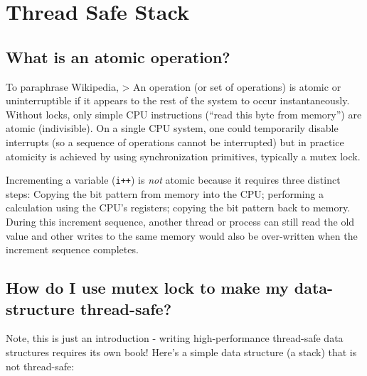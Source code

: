 \section{Thread Safe Stack}\label{thread-safe-stack}

\subsection{What is an atomic
operation?}\label{what-is-an-atomic-operation}

To paraphrase Wikipedia, \textgreater{} An operation (or set of
operations) is atomic or uninterruptible if it appears to the rest of
the system to occur instantaneously. Without locks, only simple CPU
instructions (``read this byte from memory'') are atomic (indivisible).
On a single CPU system, one could temporarily disable interrupts (so a
sequence of operations cannot be interrupted) but in practice atomicity
is achieved by using synchronization primitives, typically a mutex lock.

Incrementing a variable (\texttt{i++}) is \emph{not} atomic because it
requires three distinct steps: Copying the bit pattern from memory into
the CPU; performing a calculation using the CPU's registers; copying the
bit pattern back to memory. During this increment sequence, another
thread or process can still read the old value and other writes to the
same memory would also be over-written when the increment sequence
completes.

\subsection{How do I use mutex lock to make my data-structure
thread-safe?}\label{how-do-i-use-mutex-lock-to-make-my-data-structure-thread-safe}

Note, this is just an introduction - writing high-performance
thread-safe data structures requires its own book! Here's a simple data
structure (a stack) that is not thread-safe:

\begin{Shaded}
\begin{Highlighting}[]
 
 

  
\NormalTok{\}}

 
     
\NormalTok{\}}

 
     \NormalTok{;}
\NormalTok{\}}
\end{Highlighting}
\end{Shaded}

